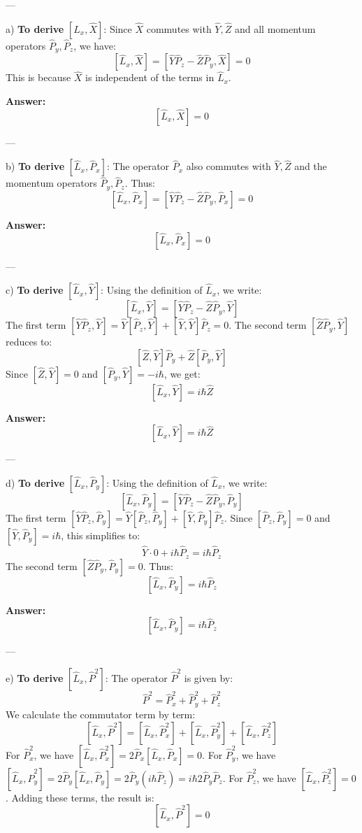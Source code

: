 ---

a) \textbf{To derive} $\left[\hat{L}_x, \hat{X}\right]$:  
Since $\hat{X}$ commutes with $\hat{Y}, \hat{Z}$ and all momentum operators $\hat{P}_y, \hat{P}_z$, we have:
\[
[\hat{L}_x, \hat{X}] = [\hat{Y}\hat{P}_z - \hat{Z}\hat{P}_y, \hat{X}] = 0
\]
This is because $\hat{X}$ is independent of the terms in $\hat{L}_x$.  

\textbf{Answer:}
\[
\left[\hat{L}_x, \hat{X}\right] = 0
\]

---

b) \textbf{To derive} $\left[\hat{L}_x, \hat{P}_x\right]$:  
The operator $\hat{P}_x$ also commutes with $\hat{Y}, \hat{Z}$ and the momentum operators $\hat{P}_y, \hat{P}_z$. Thus:
\[
[\hat{L}_x, \hat{P}_x] = [\hat{Y}\hat{P}_z - \hat{Z}\hat{P}_y, \hat{P}_x] = 0
\]

\textbf{Answer:}
\[
\left[\hat{L}_x, \hat{P}_x\right] = 0
\]

---

c) \textbf{To derive} $\left[\hat{L}_x, \hat{Y}\right]$:  
Using the definition of $\hat{L}_x$, we write:
\[
[\hat{L}_x, \hat{Y}] = [\hat{Y}\hat{P}_z - \hat{Z}\hat{P}_y, \hat{Y}]
\]
The first term $[\hat{Y}\hat{P}_z, \hat{Y}] = \hat{Y}[\hat{P}_z, \hat{Y}] + [\hat{Y}, \hat{Y}]\hat{P}_z = 0$. The second term $[\hat{Z}\hat{P}_y, \hat{Y}]$ reduces to:
\[
[\hat{Z}, \hat{Y}]\hat{P}_y + \hat{Z}[\hat{P}_y, \hat{Y}]
\]
Since $[\hat{Z}, \hat{Y}] = 0$ and $[\hat{P}_y, \hat{Y}] = -i\hbar$, we get:
\[
[\hat{L}_x, \hat{Y}] = i\hbar \hat{Z}
\]

\textbf{Answer:}
\[
\left[\hat{L}_x, \hat{Y}\right] = i\hbar \hat{Z}
\]

---

d) \textbf{To derive} $\left[\hat{L}_x, \hat{P}_y\right]$:  
Using the definition of $\hat{L}_x$, we write:
\[
[\hat{L}_x, \hat{P}_y] = [\hat{Y}\hat{P}_z - \hat{Z}\hat{P}_y, \hat{P}_y]
\]
The first term $[\hat{Y}\hat{P}_z, \hat{P}_y] = \hat{Y}[\hat{P}_z, \hat{P}_y] + [\hat{Y}, \hat{P}_y]\hat{P}_z$. Since $[\hat{P}_z, \hat{P}_y] = 0$ and $[\hat{Y}, \hat{P}_y] = i\hbar$, this simplifies to:
\[
\hat{Y} \cdot 0 + i\hbar \hat{P}_z = i\hbar \hat{P}_z
\]
The second term $[\hat{Z}\hat{P}_y, \hat{P}_y] = 0$. Thus:
\[
[\hat{L}_x, \hat{P}_y] = i\hbar \hat{P}_z
\]

\textbf{Answer:}
\[
\left[\hat{L}_x, \hat{P}_y\right] = i\hbar \hat{P}_z
\]

---

e) \textbf{To derive} $\left[\hat{L}_x, \hat{P}^2\right]$:  
The operator $\hat{P}^2$ is given by:
\[
\hat{P}^2 = \hat{P}_x^2 + \hat{P}_y^2 + \hat{P}_z^2
\]
We calculate the commutator term by term:
\[
[\hat{L}_x, \hat{P}^2] = [\hat{L}_x, \hat{P}_x^2] + [\hat{L}_x, \hat{P}_y^2] + [\hat{L}_x, \hat{P}_z^2]
\]
For $\hat{P}_x^2$, we have $[\hat{L}_x, \hat{P}_x^2] = 2\hat{P}_x[\hat{L}_x, \hat{P}_x] = 0$.  
For $\hat{P}_y^2$, we have $[\hat{L}_x, \hat{P}_y^2] = 2\hat{P}_y[\hat{L}_x, \hat{P}_y] = 2\hat{P}_y(i\hbar \hat{P}_z) = i\hbar 2\hat{P}_y\hat{P}_z$.  
For $\hat{P}_z^2$, we have $[\hat{L}_x, \hat{P}_z^2] = 0$.  
Adding these terms, the result is:
\[
[\hat{L}_x, \hat{P}^2] = 0
\]


